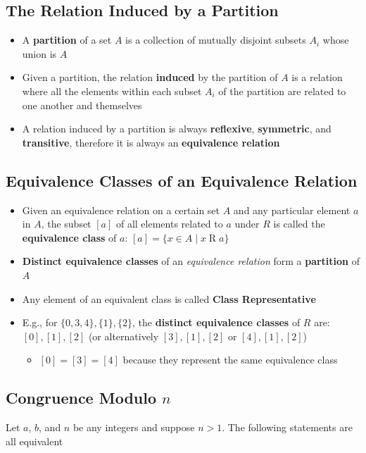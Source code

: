 \subsection{The Relation Induced by a Partition}
\begin{itemize}
  \item A \textbf{partition} of a set $A$ is a collection of mutually disjoint subsets $A_{i}$ whose union is $A$
  \item Given a partition, the relation \textbf{induced} by the partition of $A$ is a relation where all the elements within each subset $A_{i}$ of the partition are related to one another and themselves
  \item A relation induced by a partition is always \textbf{reflexive}, \textbf{symmetric}, and \textbf{transitive}, therefore it is always an \textbf{equivalence relation}
\end{itemize}

\subsection{Equivalence Classes of an Equivalence Relation}
\begin{itemize}
  \item Given an equivalence relation on a certain set $A$ and any particular element $a$ in $A$, the subset $[a]$ of all elements related to $a$ under $R$ is called the \textbf{equivalence class} of $a$: $[a] = \{ x \in A \mid x \mathrel{R} a \}$
  \item \textbf{Distinct equivalence classes} of an \textit{equivalence relation} form a \textbf{partition} of $A$
  \item Any element of an equivalent class is called \textbf{Class Representative}
  \item E.g., for $\{ 0, 3, 4 \}, \{ 1 \}, \{ 2 \}$, the \textbf{distinct equivalence classes} of $R$ are: $[0], [1], [2]$ (or alternatively $[3], [1], [2]$ or $[4], [1], [2]$)
  \begin{itemize}
    \item $[0] = [3] = [4]$ because they represent the same equivalence class
  \end{itemize}
\end{itemize}


\subsection{Congruence Modulo \texorpdfstring{$n$}{n}}
Let $a$, $b$, and $n$ be any integers and suppose $n > 1$. The following statements are all equivalent

